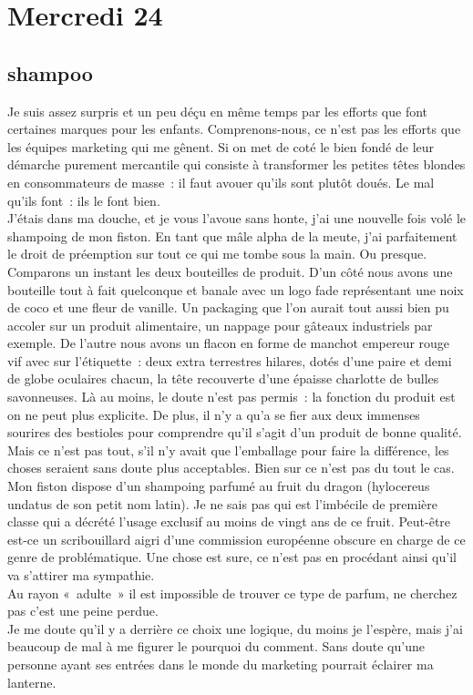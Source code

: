 ﻿\section*{Mercredi 24}
\subsection{shampoo}

Je suis assez surpris et un peu déçu en même temps par les efforts que font certaines marques pour les enfants. Comprenons-nous, ce n’est pas les efforts que les équipes marketing qui me gênent. Si on met de coté le bien fondé de leur démarche purement mercantile qui consiste à transformer les petites têtes blondes en consommateurs de masse : il faut avouer qu’ils sont plutôt doués. Le mal qu’ils font : ils le font bien. \\
J’étais dans ma douche, et je vous l’avoue sans honte, j’ai une nouvelle fois volé le shampoing de mon fiston. En tant que mâle alpha de la meute, j’ai parfaitement le droit de préemption sur tout ce qui me tombe sous la main. Ou presque. \\

Comparons un instant les deux bouteilles de produit. D’un côté nous avons une bouteille tout à fait quelconque et banale avec un logo fade représentant une noix de coco et une fleur de vanille. Un packaging que l’on aurait tout aussi bien pu accoler sur un produit alimentaire, un nappage pour gâteaux industriels par exemple. De l’autre nous avons un flacon en forme de manchot empereur rouge vif avec sur l’étiquette : deux extra terrestres hilares, dotés d’une paire et demi de globe oculaires chacun, la tête recouverte d’une épaisse charlotte de bulles savonneuses. Là au moins, le doute n’est pas permis : la fonction du produit est on ne peut plus explicite. De plus, il n’y a qu’a se fier aux deux immenses sourires des bestioles pour comprendre qu’il s’agit d’un produit de bonne qualité. \\
Mais ce n’est pas tout, s’il n’y avait que l’emballage pour faire la différence, les choses seraient sans doute plus acceptables. Bien sur ce n’est pas du tout le cas. Mon fiston dispose d’un shampoing parfumé au fruit du dragon (hylocereus undatus de son petit nom latin). Je ne sais pas qui est l’imbécile de première classe qui a décrété l’usage exclusif au moins de vingt ans de ce fruit. Peut-être est-ce un scribouillard aigri d’une commission européenne obscure en charge de ce genre de problématique. Une chose est sure, ce n’est pas en procédant ainsi qu’il va s’attirer ma sympathie.\\
Au rayon « adulte » il est impossible de trouver ce type de parfum, ne cherchez pas c’est une peine perdue.\\

Je me doute qu’il y a derrière ce choix une logique, du moins je l’espère, mais j’ai beaucoup de mal à me figurer le pourquoi du comment. Sans doute qu’une personne ayant ses entrées dans le monde du marketing pourrait éclairer ma lanterne.

